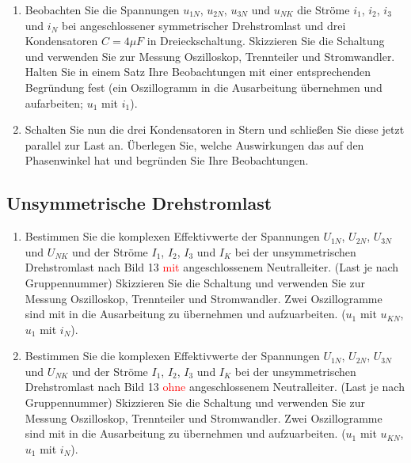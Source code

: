 \begin{enumerate}[label=\alph*)]
	 		
	 		
	 		\item Beobachten Sie die Spannungen $u_{1N}$, $u_{2N}$, $u_{3N}$ und $u_{NK}$ die Ströme $i_{1}$, $i_{2}$, $i_{3}$ und $i_{N}$ bei angeschlossener symmetrischer Drehstromlast und drei Kondensatoren $C = 4 \mu F$ in Dreieckschaltung.  Skizzieren Sie die Schaltung und verwenden Sie zur Messung Oszilloskop, Trennteiler und Stromwandler. Halten Sie in einem Satz Ihre Beobachtungen mit einer entsprechenden Begründung fest (ein Oszillogramm in die Ausarbeitung übernehmen und aufarbeiten; $u_{1}$ mit $i_{1}$).
	 		
	 		\item Schalten Sie nun die drei Kondensatoren in Stern und schließen Sie diese jetzt parallel zur Last an. Überlegen Sie, welche Auswirkungen das auf den Phasenwinkel hat und begründen Sie Ihre Beobachtungen. 
	 	\end{enumerate}
	 	
 	\subsection{Unsymmetrische Drehstromlast}
	 	\begin{enumerate}[label=\alph*)]
	 		\item Bestimmen Sie die komplexen Effektivwerte der Spannungen $U_{1N}$, $U_{2N}$, $U_{3N}$ und $U_{NK}$ und der Ströme $I_{1}$, $I_{2}$, $I_{3}$ und $I_{K}$ bei der unsymmetrischen Drehstromlast nach Bild 13 \textcolor{red}{mit} angeschlossenem Neutralleiter. (Last je nach Gruppennummer)
	 		\newline
			Skizzieren Sie die Schaltung und verwenden Sie zur Messung Oszilloskop, Trennteiler und Stromwandler. Zwei Oszillogramme sind mit in die Ausarbeitung zu übernehmen und aufzuarbeiten. ($u_{1}$ mit $u_{KN}$, $u_{1}$ mit $i_{N}$).
			
			\item Bestimmen Sie die komplexen Effektivwerte der Spannungen $U_{1N}$, $U_{2N}$, $U_{3N}$ und $U_{NK}$ und der Ströme $I_{1}$, $I_{2}$, $I_{3}$ und $I_{K}$ bei der unsymmetrischen  Drehstromlast nach Bild 13 \textcolor{red}{ohne} angeschlossenem Neutralleiter. (Last je nach Gruppennummer)
			\newline
			Skizzieren Sie die Schaltung und verwenden Sie zur Messung Oszilloskop, Trennteiler und Stromwandler. Zwei Oszillogramme sind mit in die Ausarbeitung zu übernehmen und aufzuarbeiten. ($u_{1}$ mit $u_{KN}$, $u_{1}$ mit $i_{N}$). 
			
			
	 	\end{enumerate}